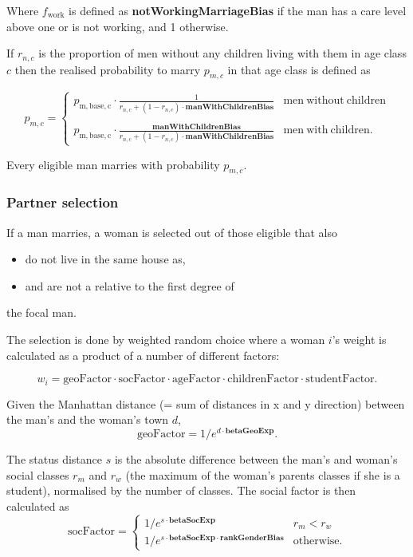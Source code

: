 \documentclass{article}
\begin{document}
Where $f_\mathrm{work}$ is defined as \textbf{notWorkingMarriageBias} if the man has a care level above one or is not working, and 1 otherwise.

If $r_{n,c}$ is the proportion of men without any children living with them in age class $c$ then the realised probability to marry $p_{m, c}$ in that age class is defined as

\[p_{m,c} = \left\{
    \begin{array}{ll}
        p_\mathrm{m, base, c} \cdot \frac{1}{r_{n,c}+(1-r_{n,c})\cdot\mathbf{manWithChildrenBias}} & \mathrm{men~without~children}\\
        \\
        p_\mathrm{m, base, c} \cdot \frac{\mathbf{manWithChildrenBias}}{r_{n,c}+(1-r_{n,c})\cdot\mathbf{manWithChildrenBias}} & \mathrm{men~with~children}.
    \end{array}\right. \]

Every eligible man marries with probability $p_{m,c}$.

\subsubsection*{Partner selection}

If a man marries, a woman is selected out of those eligible that also
\begin{itemize}
    \item do not live in the same house as,
    \item and are not a relative to the first degree of
\end{itemize}
the focal man.

The selection is done by weighted random choice where a woman $i$'s weight is calculated as a product of a number of different factors:

\[
w_i = \mathrm{geoFactor} \cdot \mathrm{socFactor} \cdot \mathrm{ageFactor} \cdot \mathrm{childrenFactor} \cdot \mathrm{studentFactor}.
\]

Given the Manhattan distance (= sum of distances in x and y direction) between the man's and the woman's town $d$, 
\[
\mathrm{geoFactor} = 1/e^{d \cdot \mathbf{betaGeoExp}}.
\]

The status distance $s$ is the absolute difference between the man's and woman's social classes $r_m$ and $r_w$ (the maximum of the woman's parents classes if she is a student), normalised by the number of classes. The social factor is then calculated as 
\[
\mathrm{socFactor} = \left\{ 
        \begin{array}{ll}
             1/e^{s \cdot \mathbf{betaSocExp}} & r_m < r_w  \\
             1/e^{s \cdot \mathbf{betaSocExp} \cdot \mathbf{rankGenderBias}} & \mathrm{otherwise}. 
        \end{array}
    \right. 
\]
\end{document}
